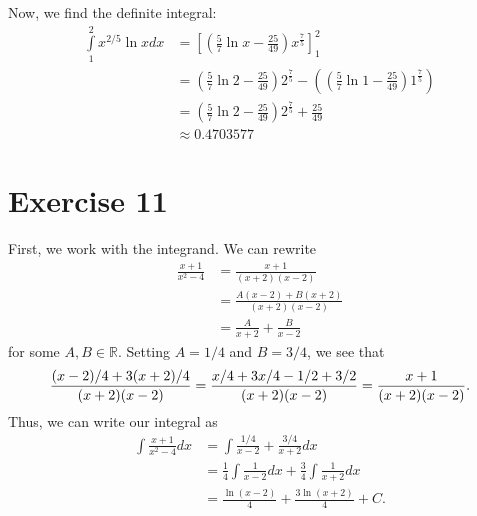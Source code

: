 \documentclass[11pt,letterpaper]{article}
\renewcommand\ex[1]{\section*{Exercise #1}}
\begin{document}
Now, we find the definite integral:
\begin{align*}
  \int\limits_{1}^{2} x^{2/5}\ln x dx
  &= \left[\left(\frac57 \ln x - \frac{ 25 }{ 49 }\right) x^{\frac75}\right]_1^2 \\
  &= \left(\frac57 \ln 2 - \frac{ 25 }{ 49 }\right) 2^{\frac75}
  - \left(\left(\frac57 \ln 1 - \frac{ 25 }{ 49 }\right) 1^{\frac75}\right) \\
  &= \left(\frac57 \ln 2 - \frac{ 25 }{ 49 }\right) 2^{\frac75}
  + \frac{ 25 }{ 49 } \\
  &\approx 0.4703577
\end{align*}


\ex{11}
First, we work with the integrand. We can rewrite
\begin{align*}
  \frac{ x + 1 }{ x^2 - 4 } &= \frac{ x + 1 }{ (x + 2)(x - 2) } \\
  &= \frac{ A(x - 2) + B(x + 2) }{ (x + 2)(x - 2) } \\
  &= \frac{ A }{ x + 2 } + \frac{ B }{ x - 2 } 
\end{align*}
for some $A, B \in \mathbb{R}$. Setting $A = 1/4$ and $B = 3/4$, we see that
\[
  \frac{ (x - 2)/4  + 3(x + 2)/4}{  (x + 2)(x - 2)  }
  = \frac{ x/4 + 3x/4 - 1/2 + 3/2}{  (x + 2)(x - 2)  }
  = \frac{ x + 1 }{ (x + 2)(x - 2) }. \\
\]
Thus, we can write our integral as
\begin{align*}
  \int \frac{ x + 1 }{ x^2 - 4 } dx
  &= \int \frac{ 1/4 }{ x - 2 } + \frac{ 3/4 }{ x + 2 } dx \\
  &= \frac14 \int \frac{ 1 }{ x - 2 } dx + \frac34 \int \frac{ 1 }{ x + 2 } dx \\
  & = \frac{ \ln (x - 2) }{ 4 } + \frac{ 3 \ln (x + 2) }{ 4 } + C.
\end{align*}
\end{document}
